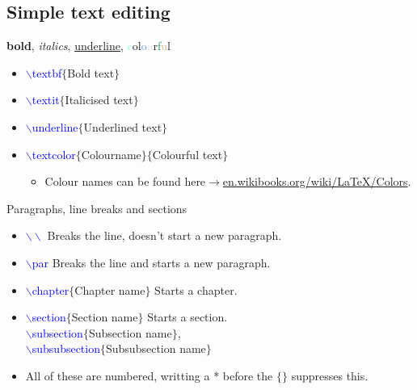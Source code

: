 \documentclass[usenames,dvipsnames,aspectratio=169]{beamer}
\newcommand{\aitem}{\item[$\cdot$]}
\begin{document}
\subsection{Simple text editing}
\begin{frame}[t]{\textbf{bold}, \textit{italics}, \underline{underline}, \textcolor{Aquamarine}{c}\textcolor{BrickRed}{o}\textcolor{CarnationPink}{l}\textcolor{CornflowerBlue}{o}\textcolor{Lavender}{u}\textcolor{Periwinkle}{r}\textcolor{SeaGreen}{f}\textcolor{Tan}{u}\textcolor{WildStrawberry}{l}}
\begin{itemize}
\item \textcolor{blue}{$\backslash$textbf}\textcolor{PineGreen}{$\{$Bold text$\}$}
\item \textcolor{blue}{$\backslash$textit}\textcolor{PineGreen}{$\{$Italicised text$\}$}
\item \textcolor{blue}{$\backslash$underline}\textcolor{PineGreen}{$\{$Underlined text$\}$}
\item \textcolor{blue}{$\backslash$textcolor}\textcolor{PineGreen}{$\{$Colourname$\}$}$\{$Colourful text$\}$
\begin{itemize}
\item Colour names can be found here$\rightarrow$\textcolor{blue}{\url{en.wikibooks.org/wiki/LaTeX/Colors}}.
\end{itemize}
\end{itemize}
\end{frame}


\begin{frame}[t]{Paragraphs, line breaks and sections}
\begin{itemize}
\aitem \textcolor{blue}{$\backslash\backslash$} Breaks the line, doesn't start a new paragraph.
\aitem \textcolor{blue}{$\backslash$par} Breaks the line and starts a new paragraph.
\aitem \textcolor{blue}{$\backslash$chapter}\textcolor{PineGreen}{$\{$Chapter name$\}$} Starts a chapter.
\aitem \textcolor{blue}{$\backslash$section}\textcolor{PineGreen}{$\{$Section name$\}$} Starts a section.\\
\textcolor{blue}{$\backslash$subsection}\textcolor{PineGreen}{$\{$Subsection name$\}$},\\
\textcolor{blue}{$\backslash$subsubsection}\textcolor{PineGreen}{$\{$Subsubsection name$\}$}
\aitem All of these are numbered, writting a * before the $\{\}$ suppresses this.
\end{itemize}
\end{frame}
\end{document}
